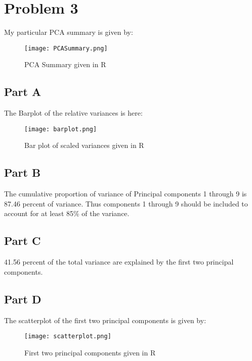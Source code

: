 \documentclass{article}
\begin{document}
\section*{Problem 3}
My particular PCA summary is given by:
\begin{figure}[hbt!]
\centering
\texttt{[image: PCASummary.png]}
\caption{PCA Summary given in R}
\end{figure}
\subsection*{Part A}
The Barplot of the relative variances is here:
\begin{figure}[hbt!]
\centering
\texttt{[image: barplot.png]}
\caption{Bar plot of scaled variances given in R}
\end{figure}
\subsection*{Part B}
The cumulative proportion of variance of Principal components 1 through 9 is 87.46 percent of variance. Thus components 1 through 9 should be included to account for at least 85\% of the variance.
\subsection*{Part C}
41.56 percent of the total variance are explained by the first two principal components.
\subsection*{Part D}
The scatterplot of the first two principal components is given by:
\begin{figure}[hbt!]
\centering
\texttt{[image: scatterplot.png]}
\caption{First two principal components given in R}
\end{figure}
\end{document}
